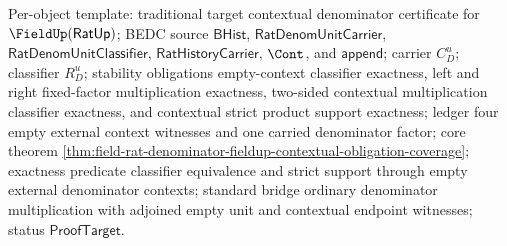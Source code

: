 Per-object template: traditional target contextual denominator certificate for
$\FieldUp(\mathsf{RatUp})$; BEDC source $\mathsf{BHist}$,
$\mathsf{RatDenomUnitCarrier}$, $\mathsf{RatDenomUnitClassifier}$,
$\mathsf{RatHistoryCarrier}$, $\Cont$, and $\mathsf{append}$; carrier $C_D^u$;
classifier $R_D^u$; stability obligations empty-context classifier exactness,
left and right fixed-factor multiplication exactness, two-sided contextual
multiplication classifier exactness, and contextual strict product support
exactness; ledger four empty external context witnesses and one carried
denominator factor; core theorem
\autoref{thm:field-rat-denominator-fieldup-contextual-obligation-coverage};
exactness predicate classifier equivalence and strict support through empty
external denominator contexts; standard bridge ordinary denominator
multiplication with adjoined empty unit and contextual endpoint witnesses;
status $\mathsf{ProofTarget}$.


